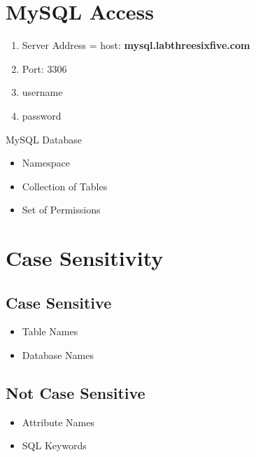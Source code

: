 \documentclass[twoside]{article}
\begin{document}
\newpage
\hfill \break 
{}

\section*{MySQL Access}
\begin{enumerate}
    \item Server Address = host: \textbf{mysql.labthreesixfive.com}
    \item Port: 3306
    \item username
    \item password
\end{enumerate}

MySQL Database
\begin{itemize}
    \item Namespace
    \item Collection of Tables
    \item Set of Permissions
\end{itemize}

\section*{Case Sensitivity}
\subsection*{Case Sensitive}
\begin{itemize}
    \item Table Names
    \item Database Names
\end{itemize}
\subsection*{Not Case Sensitive}
\begin{itemize}
    \item Attribute Names
    \item SQL Keywords
\end{itemize}
\end{document}
